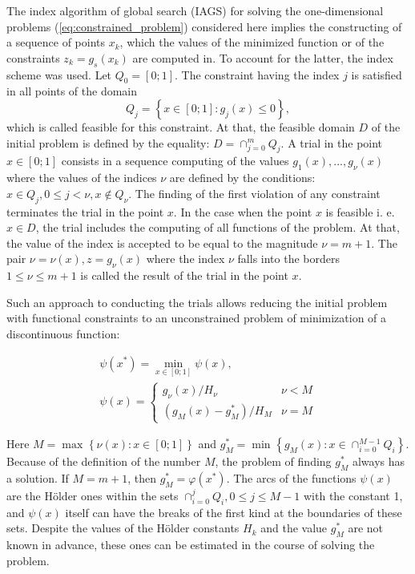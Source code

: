 \documentclass[runningheads]{llncs}
\begin{document}
The index algorithm of global search (IAGS) for solving the one-dimensional problems
(\ref{eq:constrained_problem}) considered here implies the constructing of a sequence of points
\(x_k\), which the values of the minimized function or of the constraints \(z_k = g_s(x_k)\) are
computed in.
To account for the latter, the index scheme \cite{Strongin2000} was used.
Let \(Q_0=[0;1]\). The constraint having the index \(j\) is satisfied in all points of the domain
\begin{displaymath}
  Q_j=\left\{x\in [0;1]:g_j(x)\leq 0\right\},
\end{displaymath}
which is called feasible for this constraint.
At that, the feasible domain \(D\) of the initial problem is defined by the equality:
 \(D=\cap _{j=0}^{m}Q_{j}\).
A trial in the point \(x\in [0;1]\) consists in a sequence computing of the values
\(g_{1}(x),...,g_{\nu }(x)\)
where the values of the indices \(\nu\) are defined by the conditions:
\(x\in Q_{j},0\leqslant j<\nu ,x\notin Q_{\nu }\).
The finding of the first violation of any constraint terminates the trial in the point \(x\).
In the case when the point \(x\) is feasible i. e. \(x\in D\), the trial includes the computing of all
functions of the problem.
At that, the value of the index is accepted to be equal to the magnitude \(\nu =m+1\).
The pair \(\nu =\nu (x), z=g_{\nu }(x)\) where the index \(\nu\) falls into the borders \(1\leqslant
\nu \leqslant m+1\) is called the result of the trial in the point \(x\).

Such an approach to conducting the trials allows reducing the initial problem with functional
constraints to an unconstrained problem of minimization of a discontinuous function:

\begin{displaymath}
  \begin{array}{lr}
    \psi (x^{*})=\min_{x\in [0;1]}\psi (x), \\
    \psi (x)={\begin{cases}g_{\nu }(x)/H_{\nu }&\nu <M\\(g_{M}(x)-g_{M}^{*})/H_{M}&\nu
=M\end{cases}}
  \end{array}
\end{displaymath}

Here \(M=\max_{}^{}\left\{\nu (x):x\in [0;1]\right\}\) and \(g_{M}^{*}=\min
_{}^{}\left\{g_{M}(x):x\in \cap _{i=0}^{M-1}Q_{i}\right\}\).
Because of the definition of the number \(M\), the problem of finding \(g_{M}^{*}\) always
has a solution. If \(M=m+1\), then \(g_{M}^{*}=\varphi(x^{*})\).
The arcs of the functions \(\psi (x)\) are the H\"{o}lder ones within the sets
\(\cap _{i=0}^{j}Q_{i},0\leq j\leq M-1\)
with the constant 1, and \(\psi (x)\) itself can have the breaks of the first kind at the boundaries
of these sets.
Despite the values of the H\"{o}lder constants \(H_k\) and the value \(g_{M}^{*}\) are not
known in advance, these ones can be estimated in the course of solving the problem.
\end{document}
